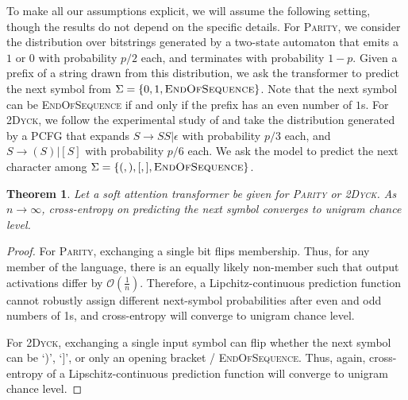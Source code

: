 \documentclass[11pt,a4paper]{article}
\newcounter{theorem}
\newtheorem{thm}[theorem]{Theorem}
\begin{document}

To make all our assumptions explicit, we will assume the following setting, though the results do not depend on the specific details.
For \textsc{Parity}, we consider the distribution over bitstrings generated by a two-state automaton that emits a $1$ or $0$ with probability $p/2$ each, and terminates with probability $1-p$.
Given a prefix of a string drawn from this distribution, we ask the transformer to predict the next symbol from $\Sigma = \{0, 1, \textsc{EndOfSequence}\}$.
Note that the next symbol can be \textsc{EndOfSequence} if and only if the prefix has an even number of $1$s.
For \textsc{2Dyck}, we follow the experimental study of \citet{skachkova2018closing} and take the distribution generated by a PCFG that expands $S \rightarrow SS | \epsilon$ with probability $p/3$ each, and $S  \rightarrow (S) | [S]$ with probability $p/6$ each.
We ask the model to predict the next character among $\Sigma = \{(,),[, ], \textsc{EndOfSequence}\}$. %

\begin{thm}
Let a soft attention transformer be given for \textsc{Parity} or \textsc{2Dyck}. %
As $n\rightarrow\infty$, cross-entropy on predicting the next symbol converges to unigram chance level.
\end{thm}

\begin{proof}
For \textsc{Parity}, exchanging a single bit flips membership.
Thus, for any member of the language, there is an equally likely non-member such that output activations differ by $\mathcal{O}(\frac{1}{n})$.
Therefore, a Lipchitz-continuous prediction function cannot robustly assign different next-symbol probabilities after even and odd numbers of 1s, and cross-entropy will converge to unigram chance level.

For \textsc{2Dyck}, exchanging a single input symbol can flip whether the next symbol can be `)', `]', or only an opening bracket / \textsc{EndOfSequence}.
Thus, again, cross-entropy of a Lipschitz-continuous prediction function will converge to unigram chance level.
\end{proof}
\end{document}

